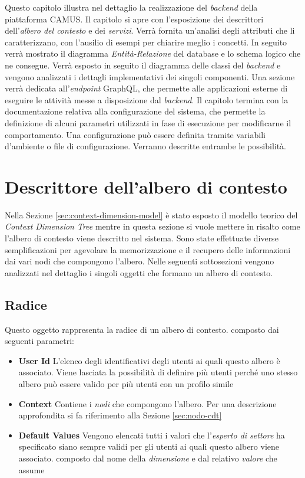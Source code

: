Questo capitolo illustra nel dettaglio la realizzazione del \emph{backend} della piattaforma CAMUS. Il capitolo si apre con l'esposizione dei descrittori dell'\emph{albero del contesto} e dei \emph{servizi}. Verrà fornita un'analisi degli attributi che li caratterizzano, con l'ausilio di esempi per chiarire meglio i concetti. In seguito verrà mostrato il diagramma \emph{Entità-Relazione} del database e lo schema logico che ne consegue. Verrà esposto in seguito il diagramma delle classi del \emph{backend} e vengono analizzati i dettagli implementativi dei singoli componenti. Una sezione verrà dedicata all'\emph{endpoint} GraphQL, che permette alle applicazioni esterne di eseguire le attività messe a disposizione dal \emph{backend}. Il capitolo termina con la documentazione relativa alla configurazione del sistema, che permette la definizione di alcuni parametri utilizzati in fase di esecuzione per modificarne il comportamento. Una configurazione può essere definita tramite variabili d'ambiente o file di configurazione. Verranno descritte entrambe le possibilità.

\section{Descrittore dell'albero di contesto\label{sec:descrittore-albero-contesto}}

Nella Sezione \ref{sec:context-dimension-model} è stato esposto il modello teorico del \emph{Context Dimension Tree} mentre in questa sezione si vuole mettere in risalto come l'albero di contesto viene descritto nel sistema. Sono state effettuate diverse semplificazioni per agevolare la memorizzazione e il recupero delle informazioni dai vari nodi che compongono l'albero. Nelle seguenti sottosezioni vengono analizzati nel dettaglio i singoli oggetti che formano un albero di contesto.

\subsection{Radice\label{sec:radice-cdt}}

Questo oggetto rappresenta la radice di un albero di contesto. \upe composto dai seguenti parametri:

\begin{itemize}
	\item \textbf{User Id}
	L'elenco degli identificativi degli utenti ai quali questo albero è associato. Viene lasciata la possibilità di definire più utenti perché uno stesso albero può essere valido per più utenti con un profilo simile
	\item \textbf{Context}
	Contiene i \emph{nodi} che compongono l'albero. Per una descrizione approfondita si fa riferimento alla Sezione \ref{sec:nodo-cdt}
	\item \textbf{Default Values}
	Vengono elencati tutti i valori che l'\emph{esperto di settore} ha specificato siano sempre validi per gli utenti ai quali questo albero viene associato. \upe composto dal nome della \emph{dimensione} e dal relativo \emph{valore} che assume
\end{itemize}

